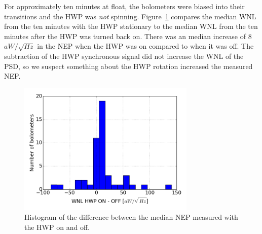 For approximately ten minutes at float, the bolometers were biased into their transitions and the \ac{HWP} was \textit{not} spinning. 
Figure~\ref{fig:hwp_on_vs_off} compares the median \ac{WNL} from the ten minutes with the \ac{HWP} stationary to the median \ac{WNL} from the ten minutes after the \ac{HWP} was turned back on. 
There was an median increase of 8 $aW/\sqrt{Hz}$ in the \ac{NEP} when the \ac{HWP} was on compared to when it was off. 
The subtraction of the \ac{HWP} synchronous signal did not increase the \ac{WNL} of the \ac{PSD}, so we suspect something about the \ac{HWP} rotation increased the measured \ac{NEP}. 


\begin{figure}[ht!]
\begin{center}
\includegraphics[height=2.5in]{figures/hwp_on_and_off_median_diff_histogram.png}
\caption[Histogram of difference between noise measured with the HWP on and off]{Histogram of the difference between the median \ac{NEP} measured with the \ac{HWP} on and off. 
\label{fig:hwp_on_vs_off} }
\end{center}
\end{figure}



